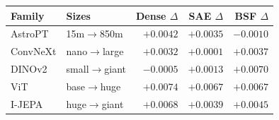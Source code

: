 \begin{tabular}{llrrr}
\toprule
Family & Sizes & Dense \(\Delta\) & SAE \(\Delta\) & BSF \(\Delta\) \\
\midrule
AstroPT & 15m$\to$850m & \(+0.0042\) & \(+0.0035\) & \(-0.0010\) \\
ConvNeXt & nano$\to$large & \(+0.0032\) & \(+0.0001\) & \(+0.0037\) \\
DINOv2 & small$\to$giant & \(-0.0005\) & \(+0.0013\) & \(+0.0070\) \\
ViT & base$\to$huge & \(+0.0074\) & \(+0.0067\) & \(+0.0067\) \\
I-JEPA & huge$\to$giant & \(+0.0068\) & \(+0.0039\) & \(+0.0045\) \\
\bottomrule
\end{tabular}
